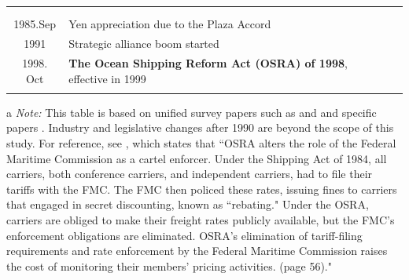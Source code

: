 \documentclass[11pt]{article}
\begin{document}
\begin{table}[ht!]
\begin{tabular}{cll}
      & &\cite{wilson1991some}\\
      & &\cite{pirrong1992application}\\
      1985.Sep & Yen appreciation due to the Plaza Accord&\\\hline
      1991 & Strategic alliance boom started &\\
      1998. Oct  & \textbf{The Ocean Shipping Reform Act (OSRA) of 1998}, effective in 1999 &\cite{reitzes2002rolling}\\
      &&\cite{fusillo2006some,fusillo2013stability}\\\hline
    \end{tabular}
    \begin{tablenotes}
\item[a]\textit{Note:} This table is based on unified survey papers such as \cite{sjostrom2004ocean,sjostrom2013competition} and \cite{martin2012market} and specific papers \citep{clyde1995effectiveness,clyde1998market}. Industry and legislative changes after 1990 are beyond the scope of this study. For reference, see \cite{reitzes2002rolling}, which states that ``OSRA alters the role of the Federal Maritime Commission as a cartel enforcer. Under the Shipping Act of 1984, all carriers, both conference carriers, and independent carriers, had to file their tariffs with the FMC. The FMC then policed these rates, issuing fines to carriers that engaged in secret discounting, known as ``rebating." Under the OSRA, carriers are obliged to make their freight rates publicly available, but the FMC's enforcement obligations are eliminated. OSRA's elimination of tariff-filing requirements and rate enforcement by the Federal Maritime Commission raises the cost of monitoring their members' pricing activities. (page 56)."
   \end{tablenotes}
\end{table}
\end{document}
